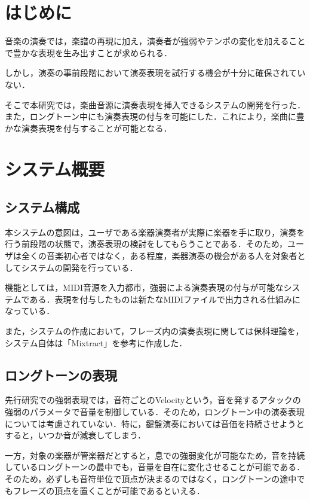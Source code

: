 

\section{はじめに}
音楽の演奏では，楽譜の再現に加え，演奏者が強弱やテンポの変化を加えることで豊かな表現を生み出すことが求められる．

しかし，演奏の事前段階において演奏表現を試行する機会が十分に確保されていない．

そこで本研究では，楽曲音源に演奏表現を挿入できるシステムの開発を行った．また，ロングトーン中にも演奏表現の付与を可能にした．これにより，楽曲に豊かな演奏表現を付与することが可能となる．


\section{システム概要}
\subsection{システム構成}
本システムの意図は，ユーザである楽器演奏者が実際に楽器を手に取り，演奏を行う前段階の状態で，演奏表現の検討をしてもらうことである．そのため，ユーザは全くの音楽初心者ではなく，ある程度，楽器演奏の機会がある人を対象者としてシステムの開発を行っている．

機能としては，MIDI音源を入力都市，強弱による演奏表現の付与が可能なシステムである．表現を付与したものは新たなMIDIファイルで出力される仕組みになっている．

また，システムの作成において，フレーズ内の演奏表現に関しては保科理論\cite{Hoshina98}を，システム自体は「Mixtract」\cite{mixtract}を参考に作成した．
\subsection{ロングトーンの表現}
先行研究での強弱表現では，音符ごとのVelocityという，音を発するアタックの強弱のパラメータで音量を制御している．そのため，ロングトーン中の演奏表現については考慮されていない．特に，鍵盤演奏においては音価を持続させようとすると，いつか音が減衰してしまう．

一方，対象の楽器が管楽器だとすると，息での強弱変化が可能なため，音を持続しているロングトーンの最中でも，音量を自在に変化させることが可能である．そのため，必ずしも音符単位で頂点が決まるのではなく，ロングトーンの途中でもフレーズの頂点を置くことが可能であるといえる．

